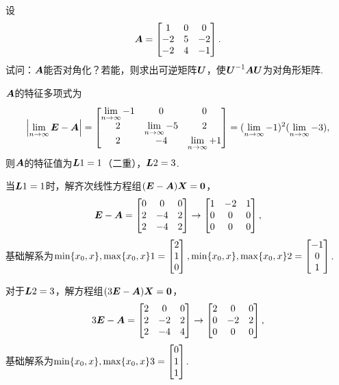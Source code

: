 \begin{example}
设\[
\A = \begin{bmatrix}
1 & 0 & 0 \\
-2 & 5 & -2 \\
-2 & 4 & -1
\end{bmatrix}.
\]试问：\(\A\)能否对角化？若能，则求出可逆矩阵\(\P\)，使\(\P^{-1}\A\P\)为对角形矩阵.
\begin{solution}
\(\A\)的特征多项式为\[
\abs{\l\E-\A} = \begin{bmatrix}
\l-1 & 0 & 0 \\
2 & \l-5 & 2 \\
2 & -4 & \l+1
\end{bmatrix} = (\l-1)^2 (\l-3),
\]则\(\A\)的特征值为\(\L{1}=1\)（二重），\(\L{2}=3\).

当\(\L{1}=1\)时，解齐次线性方程组\((\E-\A)\x=\z\)，\[
\E-\A=\begin{bmatrix}
0 & 0 & 0 \\
2 & -4 & 2 \\
2 & -4 & 2
\end{bmatrix} \to \begin{bmatrix}
1 & -2 & 1 \\
0 & 0 & 0 \\
0 & 0 & 0
\end{bmatrix},
\]基础解系为\(\X1 = \begin{bmatrix} 2 \\ 1 \\ 0 \end{bmatrix}, \X2 = \begin{bmatrix} -1 \\ 0 \\ 1 \end{bmatrix}\).

对于\(\L{2}=3\)，解方程组\((3\E-\A)\x=\z\)，\[
3\E-\A=\begin{bmatrix}
2 & 0 & 0 \\
2 & -2 & 2 \\
2 & -4 & 4
\end{bmatrix} \to \begin{bmatrix}
2 & 0 & 0 \\
0 & -2 & 2 \\
0 & 0 & 0
\end{bmatrix},
\]基础解系为\(\X3 = \begin{bmatrix} 0 \\ 1 \\ 1 \end{bmatrix}\).


\end{solution}
\end{example}
